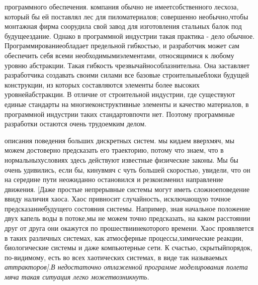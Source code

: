 \documentclass[11pt]{article}
\begin{document}
 программного обеспечения.  компания обычно не имеет\linebreak собственного лесхоза, который бы ей поставлял лес для пиломатериалов; совершенно необычно,\linebreak чтобы монтажная фирма соорудила свой завод для изготовления стальных балок под будущее\linebreak здание. Однако в программной индустрии такая практика - дело обычное. Программирование\linebreak обладает предельной гибкостью, и разработчик может сам обеспечить себя всеми необходимыми\linebreak элементами, относящимися к любому уровню абстракции. Такая гибкость чрезвычайно\linebreak соблазнительна. Она заставляет разработчика создавать своими силами все базовые строительные\linebreak блоки будущей конструкции, из которых составляются элементы более высоких уровней\linebreak абстракции. В отличие от строительной индустрии, где существуют единые стандарты на многие\linebreak конструктивные элементы и качество материалов, в программной индустрии таких стандартов\linebreak почти нет. Поэтому программные разработки остаются очень трудоемким делом. \bigskip

 описания поведения больших дискретных систем.  мы кидаем вверх\linebreak мяч, мы можем достоверно предсказать его траекторию, потому что знаем, что в нормальных\linebreak условиях здесь действуют известные физические законы. Мы бы очень удивились, если бы, кинув\linebreak мяч с чуть большей скоростью, увидели, что он на середине пути неожиданно остановился и резко\linebreak изменил направление движения. [Даже простые непрерывные системы могут иметь сложное\linebreak поведение ввиду наличия хаоса. Хаос привносит случайность, исключающую точное предсказание\linebreak будущего состояния системы. Например, зная начальное положение двух капель воды в потоке,\linebreak мы не можем точно предсказать, на каком расстоянии друг от друга они окажутся по прошествии\linebreak некоторого времени. Хаос проявляется в таких различных системах, как атмосферные процессы,\linebreak химические реакции, биологические системы и даже компьютерные сети. К счастью, скрытый\linebreak порядок, по-видимому, есть во всех хаотических системах, в виде так называемых \it аттракторов\rm].\linebreak В недостаточно отлаженной программе моделирования полета мяча такая ситуация легко может\linebreak возникнуть. 
\end{document}
